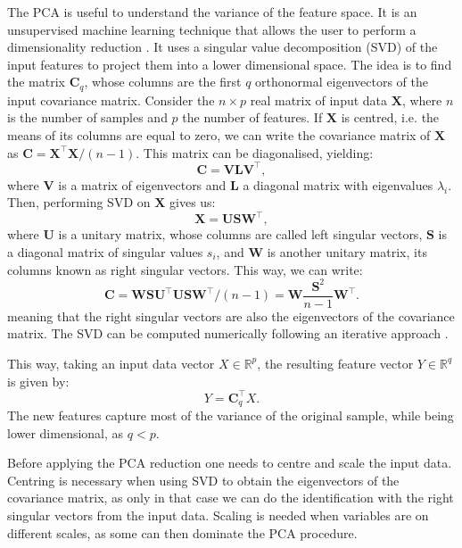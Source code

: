 The PCA is useful to understand the variance of the feature space. It is an unsupervised machine learning technique that allows the user to perform a dimensionality reduction \cite{Jolliffe2016}. It uses a singular value decomposition (SVD) of the input features to project them into a lower dimensional space. The idea is to find the matrix $\mathbf{C}_{q}$, whose columns are the first $q$ orthonormal eigenvectors of the input covariance matrix. Consider the $n \times p$ real matrix of input data $\mathbf{X}$, where $n$ is the number of samples and $p$ the number of features. If $\mathbf{X}$ is centred, i.e. the means of its columns are equal to zero, we can write the covariance matrix of $\mathbf{X}$ as $\mathbf{C}=\mathbf{X}^{\intercal}\mathbf{X}/(n-1)$. This matrix can be diagonalised, yielding:
\begin{equation}
	\mathbf{C}=\mathbf{V}\mathbf{L}\mathbf{V}^{\intercal},
\end{equation}
where $\mathbf{V}$ is a matrix of eigenvectors and $\mathbf{L}$ a diagonal matrix with eigenvalues $\lambda_{i}$. Then, performing SVD on $\mathbf{X}$ gives us:
\begin{equation}
	\mathbf{X}=\mathbf{U}\mathbf{S}\mathbf{W}^{\intercal},
\end{equation}
where $\mathbf{U}$ is a unitary matrix, whose columns are called left singular vectors, $\mathbf{S}$ is a diagonal matrix of singular values $s_{i}$, and $\mathbf{W}$ is another unitary matrix, its columns known as right singular vectors. This way, we can write:
\begin{equation}
	\mathbf{C}=\mathbf{W}\mathbf{S}\mathbf{U}^{\intercal}\mathbf{U}\mathbf{S}\mathbf{W}^{\intercal}/(n-1)=\mathbf{W}\frac{\mathbf{S}^{2}}{n-1}\mathbf{W}^{\intercal}.
\end{equation}
meaning that the right singular vectors are also the eigenvectors of the covariance matrix. The SVD can be computed numerically following an iterative approach \cite{Golub1970}.

This way, taking an input data vector $X \in \mathbb{R}^{p}$, the resulting feature vector $Y \in \mathbb{R}^{q}$ is given by:
\begin{equation}
	Y = \mathbf{C}_{q}^{\intercal} X.
\end{equation}
The new features capture most of the variance of the original sample, while being lower dimensional, as $q<p$.

Before applying the PCA reduction one needs to centre and scale the input data. Centring is necessary when using SVD to obtain the eigenvectors of the covariance matrix, as only in that case we can do the identification with the right singular vectors from the input data. Scaling is needed when variables are on different scales, as some can then dominate the PCA procedure.

